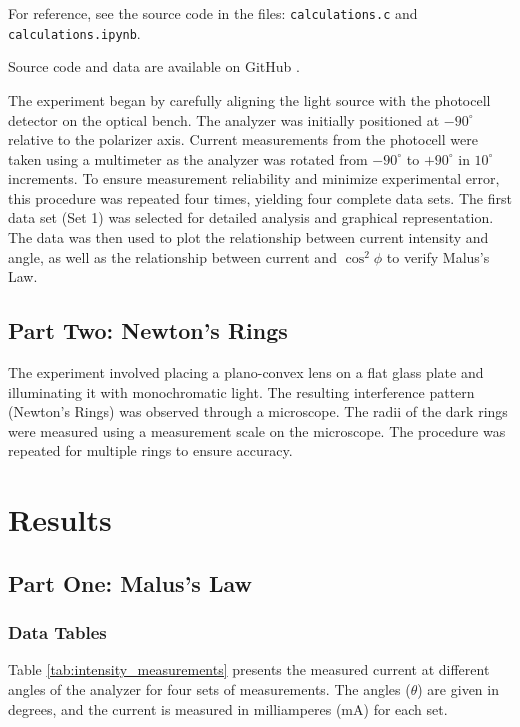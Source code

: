 \documentclass[journal]{IEEEtran}
\begin{document}
For reference, see the source code in the files: \texttt{calculations.c} and \texttt{calculations.ipynb}.

Source code and data are available on GitHub \cite{github}.

The experiment began by carefully aligning the light source with the photocell detector on the optical bench. The analyzer was initially positioned at $-90^{\circ}$ relative to the polarizer axis. Current measurements from the photocell were taken using a multimeter as the analyzer was rotated from $-90^{\circ}$ to $+90^{\circ}$ in $10^{\circ}$ increments. To ensure measurement reliability and minimize experimental error, this procedure was repeated four times, yielding four complete data sets. The first data set (Set 1) was selected for detailed analysis and graphical representation. The data was then used to plot the relationship between current intensity and angle, as well as the relationship between current and $\cos^2{\phi}$ to verify Malus's Law.

\subsection{Part Two: Newton's Rings}
The experiment involved placing a plano-convex lens on a flat glass plate and illuminating it with monochromatic light. The resulting interference pattern (Newton's Rings) was observed through a microscope. The radii of the dark rings were measured using a measurement scale on the microscope. The procedure was repeated for multiple rings to ensure accuracy.

\section{Results}

\subsection{Part One: Malus's Law}

\subsubsection{Data Tables}
Table \ref{tab:intensity_measurements} presents the measured current at different angles of the analyzer for four sets of measurements. The angles ($\theta$) are given in degrees, and the current is measured in milliamperes (mA) for each set.
\end{document}
